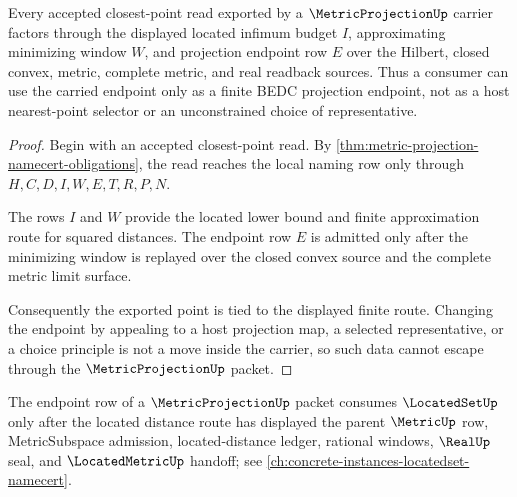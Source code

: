 \begin{theorem}\label{thm:metric-projection-closest-point-nonescape}
Every accepted closest-point read exported by a $\MetricProjectionUp$ carrier factors through the displayed located infimum budget $I$, approximating minimizing window $W$, and projection endpoint row $E$ over the Hilbert, closed convex, metric, complete metric, and real readback sources. Thus a consumer can use the carried endpoint only as a finite BEDC projection endpoint, not as a host nearest-point selector or an unconstrained choice of representative.
\end{theorem}
\begin{proof}
Begin with an accepted closest-point read. By \autoref{thm:metric-projection-namecert-obligations}, the read reaches the local naming row only through $H,C,D,I,W,E,T,R,P,N$.

The rows $I$ and $W$ provide the located lower bound and finite approximation route for squared distances. The endpoint row $E$ is admitted only after the minimizing window is replayed over the closed convex source and the complete metric limit surface.

Consequently the exported point is tied to the displayed finite route. Changing the endpoint by appealing to a host projection map, a selected representative, or a choice principle is not a move inside the carrier, so such data cannot escape through the $\MetricProjectionUp$ packet.
\end{proof}

The endpoint row of a $\MetricProjectionUp$ packet consumes $\LocatedSetUp$ only after the located distance route has displayed the parent $\MetricUp$ row, MetricSubspace admission, located-distance ledger, rational windows, $\RealUp$ seal, and $\LocatedMetricUp$ handoff; see \autoref{ch:concrete-instances-locatedset-namecert}.

